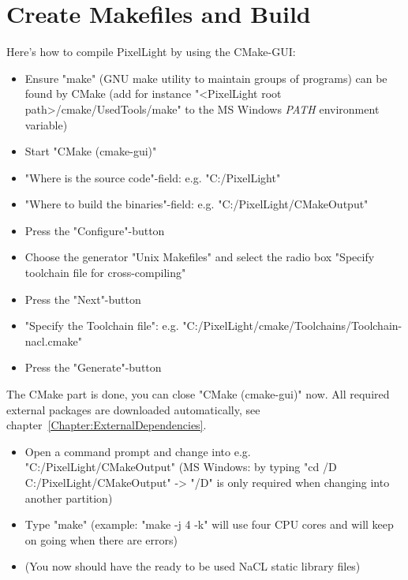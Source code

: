\section{Create Makefiles and Build}
\label{NaCL:CreateMakefilesAndBuild}
Here's how to compile PixelLight by using the CMake-\ac{GUI}:
\begin{itemize}
\item{Ensure "make" (GNU make utility to maintain groups of programs) can be found by CMake (add for instance "\textless PixelLight root path\textgreater /cmake/UsedTools/make" to the \ac{MS} Windows \emph{PATH} environment variable)}
\item{Start "CMake (cmake-gui)"}
\item{"Where is the source code"-field: e.g. "C:/PixelLight"}
\item{"Where to build the binaries"-field: e.g. "C:/PixelLight/CMakeOutput"}
\item{Press the "Configure"-button}
\item{Choose the generator "Unix Makefiles" and select the radio box "Specify toolchain file for cross-compiling"}
\item{Press the "Next"-button}
\item{"Specify the Toolchain file": e.g. "C:/PixelLight/cmake/Toolchains/Toolchain-nacl.cmake"}
\item{Press the "Generate"-button}
\end{itemize}

The CMake part is done, you can close "CMake (cmake-gui)" now. All required external packages are downloaded automatically, see chapter~\ref{Chapter:ExternalDependencies}.
\begin{itemize}
\item{Open a command prompt and change into e.g. "C:/PixelLight/CMakeOutput" (\ac{MS} Windows: by typing "cd /D C:/PixelLight/CMakeOutput" -> "/D" is only required when changing into another partition)}
\item{Type "make" (example: "make -j 4 -k" will use four \ac{CPU} cores and will keep on going when there are errors)}
\item{(You now should have the ready to be used \ac{NaCL} static library files)}
\end{itemize}
